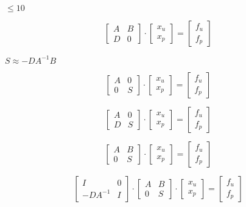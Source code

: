 \documentclass{article}
\begin{document}
$ \leq 10 $
\pagebreak

\[\begin{bmatrix} A & B\\D & 0\end{bmatrix} \cdot \begin{bmatrix} x_u\\x_p\end{bmatrix} = \begin{bmatrix} f_u\\f_p\end{bmatrix}\]
\pagebreak

$ S \approx -DA^{-1}B$
\pagebreak

\[\begin{bmatrix} A & 0\\0 & S\end{bmatrix} \cdot \begin{bmatrix} x_u\\x_p\end{bmatrix} = \begin{bmatrix} f_u\\f_p\end{bmatrix}\]
\pagebreak

\[\begin{bmatrix} A & 0\\D & S\end{bmatrix} \cdot \begin{bmatrix} x_u\\x_p\end{bmatrix} = \begin{bmatrix} f_u\\f_p\end{bmatrix}\]
\pagebreak

\[\begin{bmatrix} A & B\\0 & S\end{bmatrix} \cdot \begin{bmatrix} x_u\\x_p\end{bmatrix} = \begin{bmatrix} f_u\\f_p\end{bmatrix}\]
\pagebreak

\[\begin{bmatrix} I & 0\\-DA^{-1} & I\end{bmatrix} \cdot \begin{bmatrix} A & B\\0 & S\end{bmatrix} \cdot \begin{bmatrix} x_u\\x_p\end{bmatrix} = \begin{bmatrix} f_u\\f_p\end{bmatrix}\]
\pagebreak
\end{document}

